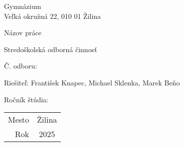\documentclass[12pt]{article}
\begin{document}
%
%
\begin{titlepage}
    \setlength{\parindent}{0pt}

    \begin{center}
        Gymnázium \\
        Veľká okružná 22, 010 01 Žilina

        \vspace{7cm}
        \Huge Názov práce

        \vspace{1.13cm}
        \Large Stredoškolská odborná činnosť

        \vspace{2.12cm}
        \normalsize Č. odboru:
    \end{center}

    \vfill

    \begin{minipage}{0.75\textwidth}
        Riešiteľ: František Knapec, Michael Sklenka, Marek Beňo \par
        Ročník štúdia:
    \end{minipage}
    \hfill
    \begin{minipage}{0.2\textwidth}
        \hfil %
        \begin{tabular}{r@{: }c}
            Mesto & Žilina \\
            Rok   & 2025
        \end{tabular}
    \end{minipage}
\end{titlepage}
\end{document}
